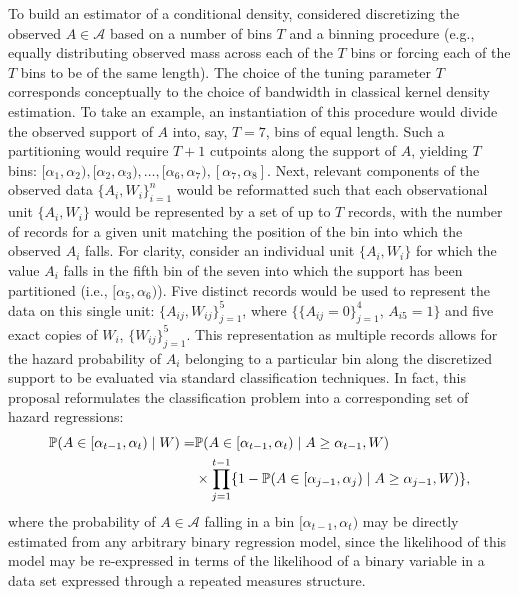 To build an estimator of a conditional density, \citet{diaz2011super} considered
discretizing the observed $A \in \mathcal{A}$ based on a number of bins $T$ and
a binning procedure (e.g., equally distributing observed mass across each of the
$T$ bins or forcing each of the $T$ bins to be of the same length). The choice
of the tuning parameter $T$ corresponds conceptually to the choice of bandwidth
in classical kernel density estimation. To take an example, an instantiation of
this procedure would divide the observed support of $A$ into, say, $T = 7$, bins
of equal length. Such a partitioning would require $T + 1$ cutpoints along
the support of $A$, yielding $T$ bins: $[\alpha_1, \alpha_2), [\alpha_2,
\alpha_3), \ldots, [\alpha_6, \alpha_7), [\alpha_7, \alpha_8]$. Next, relevant
components of the observed data $\{A_i, W_i\}_{i=1}^n$ would be reformatted such
that each observational unit $\{A_i, W_i\}$ would be represented by a set of up
to $T$ records, with the number of records for a given unit matching the
position of the bin into which the observed $A_i$ falls. For clarity, consider
an individual unit $\{A_i, W_i\}$ for which the value $A_i$ falls in the fifth
bin of the seven into which the support has been partitioned (i.e., $[\alpha_5,
\alpha_6)$). Five distinct records would be used to represent the data on this
single unit: $\{A_{ij}, W_{ij}\}_{j=1}^5$, where $\{\{A_{ij} = 0\}_{j=1}^4$,
$A_{i5} = 1\}$ and five exact copies of $W_i$, $\{W_{ij}\}_{j=1}^5$. This
representation as multiple records allows for the hazard probability of $A_i$
belonging to a particular bin along the discretized support to be evaluated via
standard classification techniques. In fact, this proposal reformulates the
classification problem into a corresponding set of hazard regressions:
\begin{align*}
   \mathbb{P} (A \in [\alpha_{t-1}, \alpha_t) \mid W) = &\mathbb{P} (A \in [\alpha_{t-1},
   \alpha_t) \mid A \geq \alpha_{t-1}, W) \\ &\times  \prod_{j = 1}^{t -1} \{1
   - \mathbb{P} (A \in [\alpha_{j-1}, \alpha_j) \mid A
   \geq \alpha_{j-1}, W) \},
\end{align*}
where the probability of $A \in \mathcal{A}$ falling in a bin $[\alpha_{t-1},
\alpha_t)$ may be directly estimated from any arbitrary binary regression model,
since the likelihood of this model may be re-expressed in terms of the
likelihood of a binary variable in a data set expressed through a repeated
measures structure.

